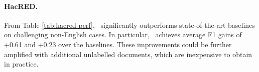 \paragraph{HacRED.}
From Table \ref{tab:hacred-perf}, \model\ significantly outperforms state-of-the-art baselines on challenging non-English cases. In particular, \model\ achieves average F1 gains of +0.61 and +0.23 over the baselines. These improvements could be further amplified with additional unlabelled documents, which are inexpensive to obtain in practice.
\begin{table}[!ht]
    \centering
    \caption{Experimental results on HacRED dataset. Baseline results are from \citet{wei2025document}.}
    \label{tab:hacred-perf}
    \vspace{-5mm}
\end{table}

